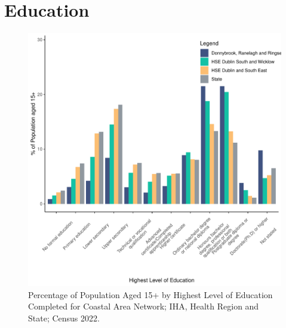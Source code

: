 \documentclass{article}
\begin{document}
\section{Education}\label{sect:Edu}
\begin{figure}[H]
	\centering
	\includegraphics[width = 120mm]{../figures/EduED.pdf}
	\caption{Percentage of Population Aged 15+ by Highest Level of Education Completed for Coastal Area Network; IHA, Health Region and State; Census 2022.}
	\label{fig:vbnv}
	\end{figure}
\end{document}
